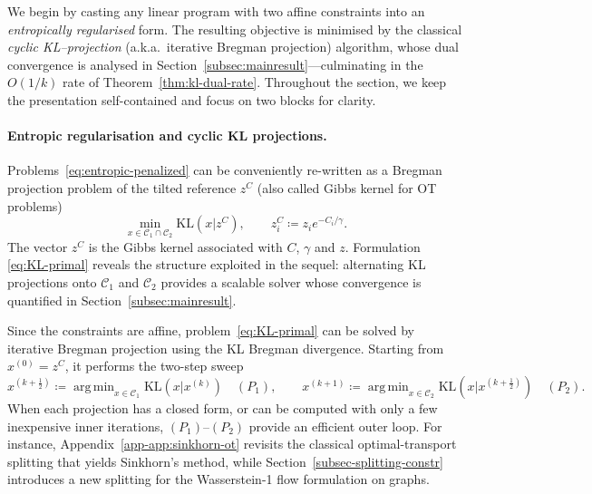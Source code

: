 \documentclass{article}
\newcommand{\argmin}{\mathop{\mathrm{arg\,min}}}
\theoremstyle{plain}
\newcommand{\eqdef}{\coloneqq}
\newcommand{\Cc}{\mathcal{C}}
\newcommand{\z}{z}
\newcommand{\zC}{\z^C}
\newcommand{\KL}{\mathrm{KL}}
\newcommand{\KLdiv}[2]{\mathrm{KL}(#1|#2)}
\begin{document}
We begin by casting any linear program with two affine constraints into an \emph{entropically regularised} form.  
The resulting objective is minimised by the classical \emph{cyclic KL--projection} (a.k.a.\ iterative Bregman projection) algorithm, whose dual convergence is analysed in Section~\ref{subsec:mainresult}---culminating in the $O(1/k)$ rate of Theorem~\ref{thm:kl-dual-rate}.  
%
Throughout the section, we keep the presentation self-contained and focus on two blocks for clarity. 

\paragraph{Entropic regularisation and cyclic KL projections.}
\label{subsec:entropic-regul-linprog}

Problems~\eqref{eq:entropic-penalized} can be conveniently re-written as a Bregman projection problem of the tilted reference $\zC$ (also called Gibbs kernel for OT problems)
\begin{equation}
	\label{eq:KL-primal}
	\min_{x\in\Cc_{1}\cap\Cc_{2}}\KLdiv{x}{\zC},
	\qquad
	\zC_{i}\eqdef \z_{i}e^{-C_{i}/\gamma}.
\end{equation}
The vector $\zC$ is the Gibbs kernel associated with $C$, $\gamma$ and $\z$.
%
Formulation \eqref{eq:KL-primal} reveals the structure exploited in the sequel: alternating KL projections onto $\Cc_{1}$ and $\Cc_{2}$ provides a scalable solver whose convergence is quantified in Section~\ref{subsec:mainresult}.

\label{subsec:cyclic}

Since the constraints are affine, problem~\eqref{eq:KL-primal} can be solved by iterative Bregman projection using the KL Bregman divergence.
%
Starting from $x^{(0)} = \zC$, it performs the two-step sweep
\begin{equation}
  x^{(k+\tfrac12)} \eqdef \argmin_{x\in\Cc_{1}}\KL(x|x^{(k)})\quad(P_1),
  \qquad
  x^{(k+1)} \eqdef \argmin_{x\in\Cc_{2}}\KL(x|x^{(k+\tfrac12)})\quad(P_2).
\end{equation}
When each projection has a closed form, or can be computed with only a few inexpensive inner iterations, $(P_1)$--$(P_2)$ provide an efficient outer loop. For instance, Appendix~\ref{app-app:sinkhorn-ot} revisits the classical optimal-transport splitting that yields Sinkhorn’s method, while Section~\ref{subsec-splitting-constr} introduces a new splitting for the Wasserstein-1 flow formulation on graphs. 
\end{document}
